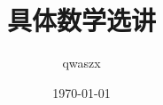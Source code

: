 \documentclass[11pt,aspectratio=169]{beamer}
\title{具体数学选讲}
\author{qwaszx}
\date{\today}
\begin{document}
\begin{frame}
  \titlepage
\end{frame}












\end{document}
